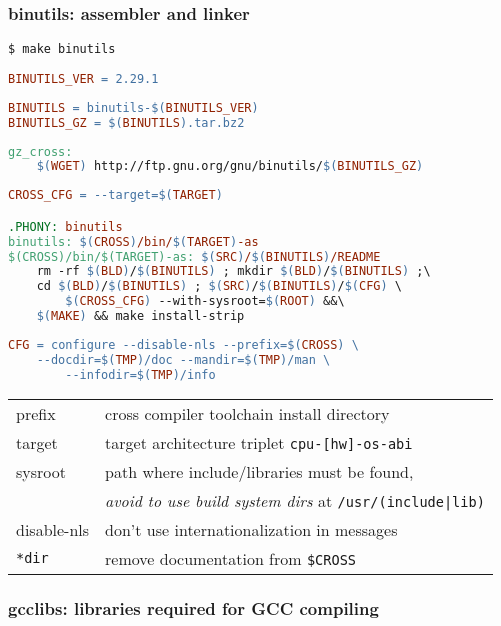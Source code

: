\subsubsection{binutils: assembler and linker}

\begin{lstlisting}
$ make binutils
\end{lstlisting}
\begin{lstlisting}[language=make,title=mk/version]
BINUTILS_VER = 2.29.1
\end{lstlisting}
\begin{lstlisting}[language=make,title=mk/package]
BINUTILS = binutils-$(BINUTILS_VER)
BINUTILS_GZ = $(BINUTILS).tar.bz2
\end{lstlisting}
\begin{lstlisting}[language=make,title=mk/gz]
gz_cross:
	$(WGET) http://ftp.gnu.org/gnu/binutils/$(BINUTILS_GZ)
\end{lstlisting}
\begin{lstlisting}[language=make,title=mk/cross]
CROSS_CFG = --target=$(TARGET) 

.PHONY: binutils
binutils: $(CROSS)/bin/$(TARGET)-as
$(CROSS)/bin/$(TARGET)-as: $(SRC)/$(BINUTILS)/README
	rm -rf $(BLD)/$(BINUTILS) ; mkdir $(BLD)/$(BINUTILS) ;\
	cd $(BLD)/$(BINUTILS) ; $(SRC)/$(BINUTILS)/$(CFG) \
		$(CROSS_CFG) --with-sysroot=$(ROOT) &&\
	$(MAKE) && make install-strip
\end{lstlisting}
\begin{lstlisting}[language=make,title=mk/cfg]
CFG = configure --disable-nls --prefix=$(CROSS) \
	--docdir=$(TMP)/doc --mandir=$(TMP)/man \
		--infodir=$(TMP)/info
\end{lstlisting}

\begin{tabular}{l l}
prefix & cross compiler toolchain install directory\\
target & target architecture triplet \verb|cpu-[hw]-os-abi| \\
sysroot & path where include/libraries must be found,\\
& \emph{avoid to use build system dirs} at \verb$/usr/(include|lib)$\\
\hline
disable-nls & don't use internationalization in messages \\
\verb$*dir$ & remove documentation from \verb|$CROSS|\\
\end{tabular}

\subsubsection{gcclibs: libraries required for GCC compiling}

